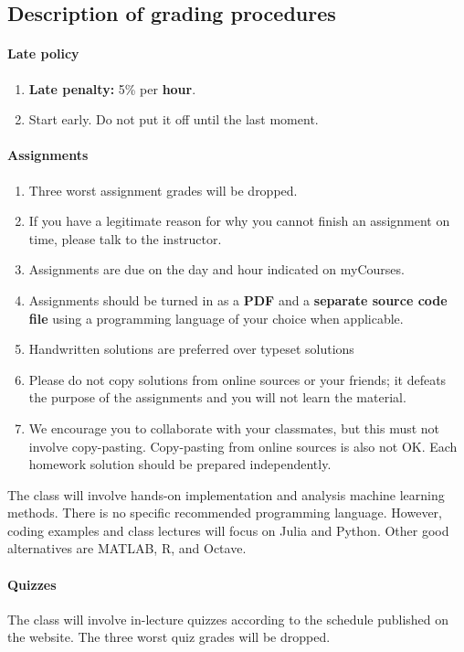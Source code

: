 \documentclass[11pt]{article}
\begin{document}
\subsection{Description of grading procedures}

\paragraph{Late policy}
\begin{enumerate}[nosep]
\item \textbf{Late penalty:} 5\% per \textbf{hour}.
\item Start early. Do not put it off until the last moment.
\end{enumerate}

\paragraph{Assignments}
\begin{enumerate}[nosep]
\item Three worst assignment grades will be dropped.
    \item If you have a legitimate reason for why you cannot finish an assignment on time, please talk to the instructor.
    \item Assignments are due on the day and hour indicated on myCourses. 
    \item Assignments should be turned in as a \textbf{PDF} and a \textbf{separate source code file} using a programming language of your choice when applicable.
    \item Handwritten solutions are preferred over typeset solutions
    \item Please do not copy solutions from online sources or your friends; it defeats the purpose of the assignments and you will not learn the material.
    \item We encourage you to collaborate with your classmates, but this must not involve copy-pasting. Copy-pasting from online sources is also not OK. Each homework solution should be prepared independently.
\end{enumerate}

The class will involve hands-on implementation and analysis machine learning methods. There is no specific recommended programming language. However, coding examples and class lectures will focus on Julia and Python. Other good alternatives are MATLAB, R, and Octave. 

\paragraph{Quizzes} The class will involve in-lecture quizzes according to the schedule published on the website. The three worst quiz grades will be dropped.
\end{document}
